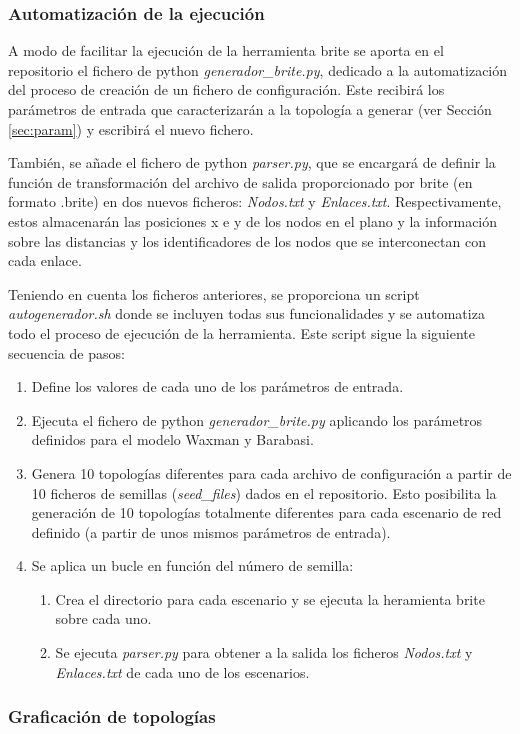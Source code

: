 \subsubsection{Automatización de la ejecución}
\label{sec:brite_eje}

A modo de facilitar la ejecución de la herramienta \gls{brite} se aporta en el repositorio el fichero de python \textit{generador\_brite.py}, dedicado a la automatización del proceso de creación de un fichero de configuración. Este recibirá los parámetros de entrada que caracterizarán a la topología a generar (ver Sección \ref{sec:param}) y escribirá el nuevo fichero.

\vspace{3mm}

También, se añade el fichero de python \textit{parser.py}, que se encargará de definir la función de transformación del archivo de salida proporcionado por \gls{brite} (en formato .brite) en dos nuevos ficheros: \textit{Nodos.txt} y \textit{Enlaces.txt}. Respectivamente, estos almacenarán las posiciones x e y de los nodos en el plano y la información sobre las distancias y los identificadores de los nodos que se interconectan con cada enlace.

\vspace{3mm}

Teniendo en cuenta los ficheros anteriores, se proporciona un script \textit{autogenerador.sh} donde se incluyen todas sus funcionalidades y se automatiza todo el proceso de ejecución de la herramienta. Este script sigue la siguiente secuencia de pasos:

\begin{enumerate}
    \item Define los valores de cada uno de los parámetros de entrada.
    \item Ejecuta el fichero de python \textit{generador\_brite.py} aplicando los parámetros definidos para el modelo Waxman y Barabasi.
    \item Genera 10 topologías diferentes para cada archivo de configuración a partir de 10 ficheros de semillas (\textit{seed\_files}) dados en el repositorio. Esto posibilita la generación de 10 topologías totalmente diferentes para cada escenario de red definido (a partir de unos mismos parámetros de entrada). 
    \item Se aplica un bucle en función del número de semilla:
    \begin{enumerate} 
        \item Crea el directorio para cada escenario y se ejecuta la heramienta \gls{brite} sobre cada uno.
        \item Se ejecuta \textit{parser.py} para obtener a la salida los ficheros \textit{Nodos.txt} y \textit{Enlaces.txt} de cada uno de los escenarios.   
    \end{enumerate} 
\end{enumerate}

\subsubsection{Graficación de topologías}
